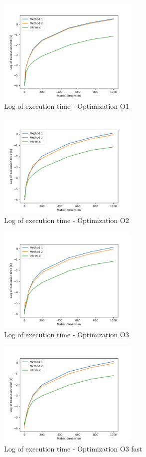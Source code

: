\documentclass[a4paper,12pt]{article}
\begin{document}
\begin{figure}[h]
	\centering
	\includegraphics[width=0.6\textwidth]{perfO1.png}
	\caption{Log of execution time - Optimization O1}
\end{figure}
\begin{figure}[h]
	\centering
	\includegraphics[width=0.6\textwidth]{perfO2.png}
	\caption{Log of execution time - Optimization O2}
\end{figure}
\begin{figure}[h]
	\centering
	\includegraphics[width=0.6\textwidth]{perfO3.png}
	\caption{Log of execution time - Optimization O3}
\end{figure}
\begin{figure}[h]
	\centering
	\includegraphics[width=0.6\textwidth]{perfO3fast.png}
	\caption{Log of execution time - Optimization O3 fast}
\end{figure}
\end{document}
